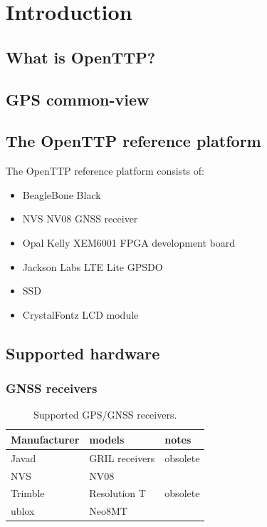 \documentclass[11pt,a4paper,openany,oneside]{book}
\begin{document}
\chapter{Introduction}

\section{What is OpenTTP?}

\section{GPS common-view}

\section{The OpenTTP reference platform}

The OpenTTP reference platform consists of:
\begin{itemize}
\item BeagleBone Black
\item NVS NV08 GNSS receiver
\item Opal Kelly XEM6001 FPGA development board
\item Jackson Labs LTE Lite GPSDO
\item SSD
\item CrystalFontz LCD module
\end{itemize}

\section{Supported hardware}

	\subsection{GNSS receivers}
	
	\begin{table}
	\begin{tabular}{lll}
	Manufacturer & models & notes \\ \hline
	Javad & GRIL receivers & obsolete \\
	NVS   & NV08 & \\
	Trimble & Resolution T & obsolete\\
	ublox & Neo8MT & \\
	\end{tabular}
	\caption{Supported GPS/GNSS receivers.}
	\end{table}
	
\end{document}
